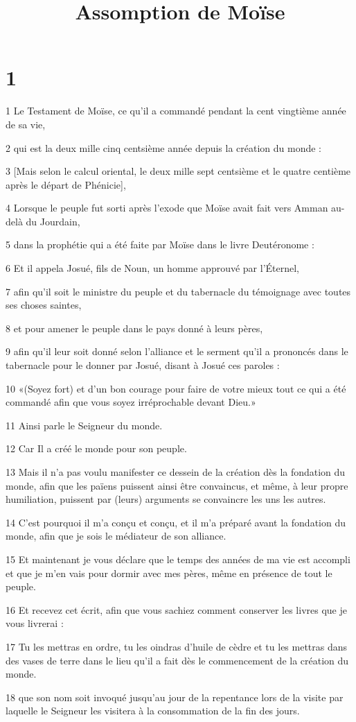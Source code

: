 

\title{Assomption de Moïse}

\chapter{1}

\par 1 Le Testament de Moïse, ce qu'il a commandé pendant la cent vingtième année de sa vie,
\par 2 qui est la deux mille cinq centsième année depuis la création du monde :
\par 3 [Mais selon le calcul oriental, le deux mille sept centsième et le quatre centième après le départ de Phénicie],
\par 4 Lorsque le peuple fut sorti après l'exode que Moïse avait fait vers Amman au-delà du Jourdain,
\par 5 dans la prophétie qui a été faite par Moïse dans le livre Deutéronome :
\par 6 Et il appela Josué, fils de Noun, un homme approuvé par l'Éternel,
\par 7 afin qu'il soit le ministre du peuple et du tabernacle du témoignage avec toutes ses choses saintes,
\par 8 et pour amener le peuple dans le pays donné à leurs pères,
\par 9 afin qu'il leur soit donné selon l'alliance et le serment qu'il a prononcés dans le tabernacle pour le donner par Josué, disant à Josué ces paroles :
\par 10 «(Soyez fort) et d'un bon courage pour faire de votre mieux tout ce qui a été commandé afin que vous soyez irréprochable devant Dieu.»
\par 11 Ainsi parle le Seigneur du monde.
\par 12 Car Il a créé le monde pour son peuple.
\par 13 Mais il n'a pas voulu manifester ce dessein de la création dès la fondation du monde, afin que les païens puissent ainsi être convaincus, et même, à leur propre humiliation, puissent par (leurs) arguments se convaincre les uns les autres.
\par 14 C'est pourquoi il m'a conçu et conçu, et il m'a préparé avant la fondation du monde, afin que je sois le médiateur de son alliance.
\par 15 Et maintenant je vous déclare que le temps des années de ma vie est accompli et que je m'en vais pour dormir avec mes pères, même en présence de tout le peuple.
\par 16 Et recevez cet écrit, afin que vous sachiez comment conserver les livres que je vous livrerai :
\par 17 Tu les mettras en ordre, tu les oindras d'huile de cèdre et tu les mettras dans des vases de terre dans le lieu qu'il a fait dès le commencement de la création du monde.
\par 18 que son nom soit invoqué jusqu'au jour de la repentance lors de la visite par laquelle le Seigneur les visitera à la consommation de la fin des jours.

